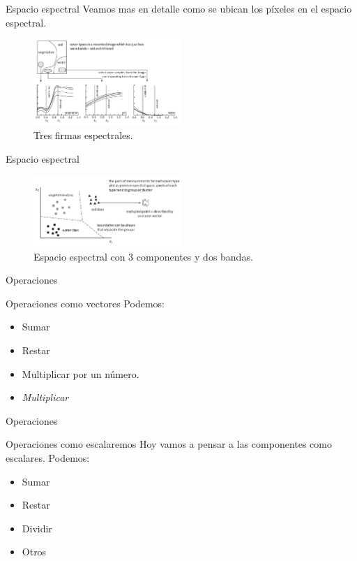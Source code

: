 \documentclass[handout]{beamer}
\begin{document}
\begin{frame}{Espacio espectral}
  Veamos mas en detalle como se ubican los píxeles en el espacio espectral. \pause
  \begin{figure}
    \includegraphics[width=0.5\textwidth]{imagenes/firmas-3.png}
    \caption{Tres firmas espectrales. }
  \end{figure}
\end{frame}

\begin{frame}{Espacio espectral}
  \begin{figure}
    \includegraphics[width=0.5\textwidth]{imagenes/espacio-3.png}
    \caption{Espacio espectral con 3 componentes y dos bandas. }
  \end{figure}
\end{frame}
\begin{frame}{Operaciones}
  \begin{block}{Operaciones como vectores}
    Podemos:
    \begin{itemize}[<+->]
      \item Sumar
      \item Restar
      \item Multiplicar por un número.
      \item \emph{Multiplicar}
    \end{itemize}
  \end{block}
\end{frame}

\begin{frame}{Operaciones}
  \begin{block}{Operaciones como escalaremos}
    Hoy vamos a pensar a las componentes como escalares. Podemos:
    \begin{itemize}[<+->]
      \item Sumar
      \item Restar
      \item Dividir
      \item Otros
    \end{itemize}
  \end{block}
\end{frame}
\end{document}
